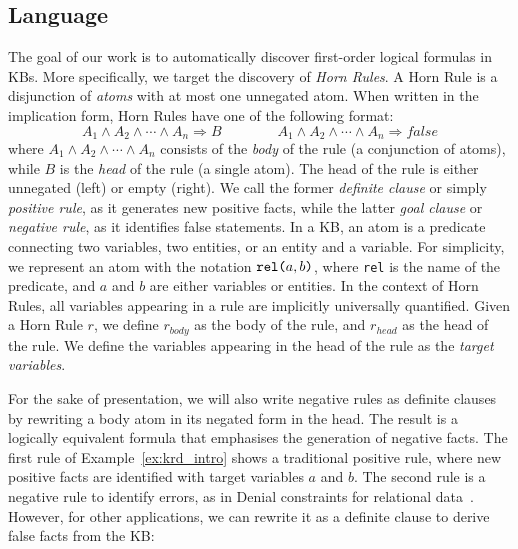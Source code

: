 \subsection{Language} \label{sec:krd_language} 
The goal of our work is to automatically discover first-order logical formulas in KBs. More specifically, we target the discovery of \emph{Horn Rules}. A Horn Rule is a disjunction of \emph{atoms} with at most one unnegated atom. When written in the implication form, Horn Rules have one of the following format:
%
\begin{equation*}
A_1 \wedge A_2 \wedge \cdots \wedge A_n \Rightarrow B \qquad \qquad A_1 \wedge A_2 \wedge \cdots \wedge A_n \Rightarrow  false 
\end{equation*} %
%
where $A_1 \wedge A_2 \wedge \cdots \wedge A_n$ consists of the \emph{body} of the rule (a conjunction of atoms), while $B$ is the \emph{head} of the rule (a single atom). The head of the rule is either unnegated (left) or empty (right). We call the former \emph{definite clause} or simply \emph{positive rule}, as it generates new positive facts, while the latter \emph{goal clause} or \emph{negative rule}, as it identifies false statements. In a KB, an atom is a predicate connecting two variables, two entities, or an entity and a variable. For simplicity, we represent an atom with the notation $\texttt{rel(}a,b\texttt{)}$, where \texttt{rel} is the name of the predicate, and $a$ and $b$ are either variables or entities. In the context of Horn Rules, all variables appearing in a rule are implicitly universally quantified. Given a Horn Rule $r$, we define $r_{body}$ as the body of the rule, and $r_{head}$ as the head of the rule. We define the variables appearing in the head of the rule as the \emph{target variables}. 

For the sake of presentation, we will also write negative rules as definite clauses by rewriting a body atom in its negated form in the head. The result is a logically equivalent formula that emphasises the generation of negative facts.
The first rule of Example~\ref{ex:krd_intro} shows a traditional positive rule, where new positive facts are identified with target variables $a$ and $b$.
The second rule is a negative rule to identify errors, as in Denial constraints for relational data~\cite{chu2013discovering}. However, for other applications, we can rewrite it as a definite clause to derive false facts from the KB:

